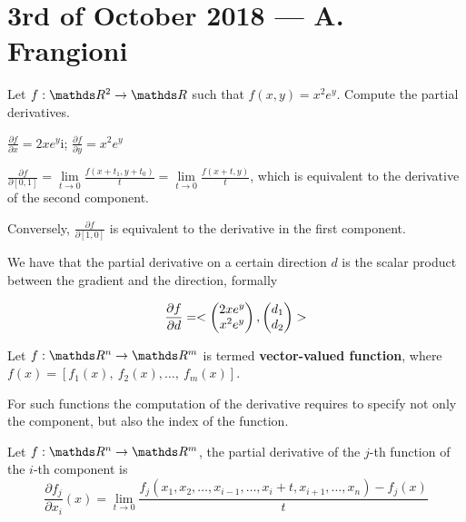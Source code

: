 \documentclass[computational_mathematics.tex]{subfiles}
\begin{document}
\section{3rd of October 2018 --- A. Frangioni}
\begin{example}[On derivatives]
Let $f:\R^2 \to \R$ such that $f(x, y) = x^2 e^y$. Compute the partial derivatives.

$\frac{\partial f}{\partial x} = 2x e^y $i; $\frac{\partial f}{\partial y} = x^2 e^y $

$\frac{\partial f}{\partial [0, 1]} = \lim\limits_{t \to 0} \frac{f(x + t_1, y + t_0)}{t} =  \lim\limits_{t \to 0} \frac{f(x + t, y)}{t}$, which is equivalent to the derivative of the second component.

Conversely, $\frac{\partial f}{\partial [1, 0]}$ is equivalent to the derivative in the first component.
\end{example}
We have that the partial derivative on a certain direction $d$ is the scalar product between the gradient and the direction, formally

\[
  \frac{\partial f}{\partial d} = <\begin{pmatrix}2x e^y\\ x^2 e^y\end{pmatrix}, \begin{pmatrix} d_1\\ d_2 \end{pmatrix}>
\]

\begin{definition}
  Let $f: \R^n \to \R^m$ is termed \textbf{vector-valued function}, where $f(x) =  [f_1(x),~f_2(x), \ldots,~f_m(x)]$.
\end{definition}

For such functions the computation of the derivative requires to specify not only the component, but also the index of the function.

\begin{definition}
Let $f: \R^n \to \R^m$, the partial derivative of the $j$-th function of the $i$-th component is
\[
   \frac{\partial f_{j}}{\partial x_i}(x) =
   \lim_{t \to 0} \frac{f_{j}(x_1, x_2, \ldots, x_{i-1}, \ldots, x_i + t, x_{i+1}, \ldots, x_n) - f_{j}(x)}{t}
\]
\end{definition}
\end{document}
